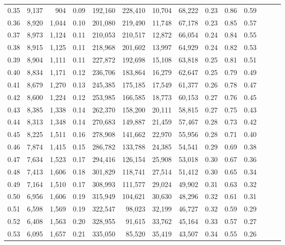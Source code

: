 \begin{tabular}{rrrrrrrrrrrrrr}
0.35 &  9,137 &    904 &  0.09 &  192,160 &  228,410 &  10,704 &  68,222 &  0.23 &  0.86 &      0.59 \\
0.36 &  8,920 &  1,044 &  0.10 &  201,080 &  219,490 &  11,748 &  67,178 &  0.23 &  0.85 &      0.57 \\
0.37 &  8,973 &  1,124 &  0.11 &  210,053 &  210,517 &  12,872 &  66,054 &  0.24 &  0.84 &      0.55 \\
0.38 &  8,915 &  1,125 &  0.11 &  218,968 &  201,602 &  13,997 &  64,929 &  0.24 &  0.82 &      0.53 \\
0.39 &  8,904 &  1,111 &  0.11 &  227,872 &  192,698 &  15,108 &  63,818 &  0.25 &  0.81 &      0.51 \\
0.40 &  8,834 &  1,171 &  0.12 &  236,706 &  183,864 &  16,279 &  62,647 &  0.25 &  0.79 &      0.49 \\
0.41 &  8,679 &  1,270 &  0.13 &  245,385 &  175,185 &  17,549 &  61,377 &  0.26 &  0.78 &      0.47 \\
0.42 &  8,600 &  1,224 &  0.12 &  253,985 &  166,585 &  18,773 &  60,153 &  0.27 &  0.76 &      0.45 \\
0.43 &  8,385 &  1,338 &  0.14 &  262,370 &  158,200 &  20,111 &  58,815 &  0.27 &  0.75 &      0.43 \\
0.44 &  8,313 &  1,348 &  0.14 &  270,683 &  149,887 &  21,459 &  57,467 &  0.28 &  0.73 &      0.42 \\
0.45 &  8,225 &  1,511 &  0.16 &  278,908 &  141,662 &  22,970 &  55,956 &  0.28 &  0.71 &      0.40 \\
0.46 &  7,874 &  1,415 &  0.15 &  286,782 &  133,788 &  24,385 &  54,541 &  0.29 &  0.69 &      0.38 \\
0.47 &  7,634 &  1,523 &  0.17 &  294,416 &  126,154 &  25,908 &  53,018 &  0.30 &  0.67 &      0.36 \\
0.48 &  7,413 &  1,606 &  0.18 &  301,829 &  118,741 &  27,514 &  51,412 &  0.30 &  0.65 &      0.34 \\
0.49 &  7,164 &  1,510 &  0.17 &  308,993 &  111,577 &  29,024 &  49,902 &  0.31 &  0.63 &      0.32 \\
0.50 &  6,956 &  1,606 &  0.19 &  315,949 &  104,621 &  30,630 &  48,296 &  0.32 &  0.61 &      0.31 \\
0.51 &  6,598 &  1,569 &  0.19 &  322,547 &   98,023 &  32,199 &  46,727 &  0.32 &  0.59 &      0.29 \\
0.52 &  6,408 &  1,563 &  0.20 &  328,955 &   91,615 &  33,762 &  45,164 &  0.33 &  0.57 &      0.27 \\
0.53 &  6,095 &  1,657 &  0.21 &  335,050 &   85,520 &  35,419 &  43,507 &  0.34 &  0.55 &      0.26 \\

\end{tabular}
